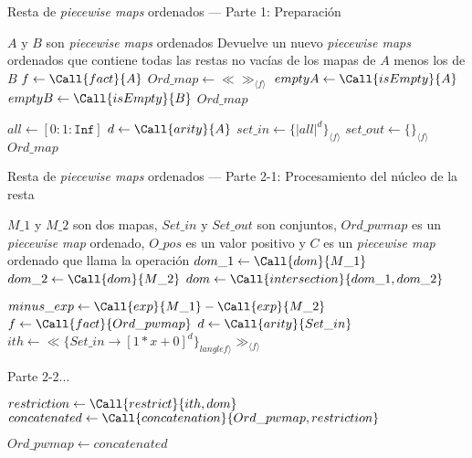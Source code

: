 \begin{algorithm}
\caption{Resta de \textit{piecewise maps} ordenados — Parte 1: Preparación}
\label{alg:resta-ord}
\begin{algorithmic}[1]
\Require $A$ y $B$ son \textit{piecewise maps} ordenados
\Ensure Devuelve un nuevo \textit{piecewise maps} ordenados que contiene todas las restas no vacías de los mapas de $A$ menos los de $B$
    \State $f \gets \Call{fact}{A}$
    \State $Ord\_map \gets \ll\gg_{\langle f \rangle}$
    \State $emptyA \gets \Call{isEmpty}{A}$
    \State $emptyB \gets \Call{isEmpty}{B}$
        \State \Return $Ord\_map$
    \EndIf

    \State $all \gets [0: 1: \texttt{Inf}]$ 
    \State$d \gets \Call{arity}{A}$
    \State $set\_in \gets \{|all|^{d}\}_{\langle f \rangle}$
    \State $set\_out \gets \{\}_{\langle f \rangle}$
    \State {}
    \State \Return $Ord\_map$
\EndFunction
\end{algorithmic}
\end{algorithm}

\begin{algorithm}
\caption{Resta de \textit{piecewise maps} ordenados — Parte 2-1: Procesamiento del núcleo de la resta}
\label{alg:resta-nuecleo-ord1}
\begin{algorithmic}[1]
\Require $M\_1$ y $M\_2$ son dos mapas, $Set\_in$ y $Set\_out$ son conjuntos, $Ord\_pwmap$ es un \textit{piecewise map} ordenado, $O\_pos$ es un valor positivo y $C$ es un \textit{piecewise map} ordenado que llama la operación
     \State $dom\_1 \gets\Call{dom}{M\_1}$
     \State $dom\_2 \gets\Call{dom}{M\_2}$
    \State $dom \gets \Call{intersection}{dom\_1,dom\_2}$
        \State \Return
    \EndIf

    \State $minus\_exp \gets \Call{exp}{M\_1} - \Call{exp}{M\_2}$
    \State $f \gets \Call{fact}{Ord\_pwmap}$
     \State$d \gets \Call{arity}{Set\_in}$
    \State $ith \gets \ll\{Set\_in \rightarrow [1*x+0]^d \}_{langle f \rangle}\gg_{\langle f \rangle}$

    \State Parte 2-2...

    \State $restriction \gets  \Call{restrict}{ith, dom}$
    \State $concatenated \gets \Call{concatenation}{Ord\_pwmap,restriction }$

    \State $Ord\_pwmap \gets concatenated$
    \State \Return
\EndFunction
\end{algorithmic}
\end{algorithm}

